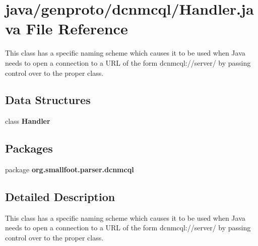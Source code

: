 \section{java/genproto/dcnmcql/\+Handler.java File Reference}
\label{dcnmcql_2Handler_8java}


This class has a specific naming scheme which causes it to be used when Java needs to open a connection to a U\+R\+L of the form dcnmcql\+://server/ by passing control over to the proper class.  


\subsection*{Data Structures}
\begin{DoxyCompactItemize}
\item 
class {\bf Handler}
\end{DoxyCompactItemize}
\subsection*{Packages}
\begin{DoxyCompactItemize}
\item 
package {\bf org.\+smallfoot.\+parser.\+dcnmcql}
\end{DoxyCompactItemize}


\subsection{Detailed Description}
This class has a specific naming scheme which causes it to be used when Java needs to open a connection to a U\+R\+L of the form dcnmcql\+://server/ by passing control over to the proper class. 

